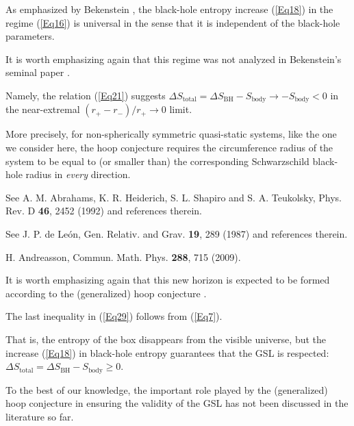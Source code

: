 \documentclass[12pt,preprintnumbers,amsmath,amssymbm,prd]{revtex4-1}
\begin{document}
\begin{thebibliography}{99}
 As emphasized by Bekenstein \cite{Bek73}, the black-hole entropy
increase (\ref{Eq18}) in the regime (\ref{Eq16}) \cite{Noteimb} is
universal in the sense that it is independent of the black-hole
parameters.

 It is worth emphasizing again \cite{Noteim,Noteimb}
that this regime was not analyzed in Bekenstein's seminal paper
\cite{Bek73}.

 Namely, the relation (\ref{Eq21}) suggests $\Delta
S_{\text{total}}=\Delta S_{\text{BH}}-S_{\text{body}}\to
-S_{\text{body}}<0$ in the near-extremal $(r_+-r_-)/r_+\to 0$ limit.

 More precisely, for non-spherically symmetric quasi-static systems,
like the one we consider here, the hoop conjecture \cite{Thorne}
requires the circumference radius of the system to be equal to (or
smaller than) the corresponding Schwarzschild black-hole radius in
{\it every} direction.

  See A. M. Abrahams, K. R. Heiderich, S. L. Shapiro and S. A. Teukolsky,
Phys. Rev. D {\bf 46}, 2452 (1992) and references therein.

 See J. P. de Le\'on, Gen. Relativ. and Grav. {\bf 19},
289 (1987) and references therein.

 H. Andreasson, Commun. Math. Phys. {\bf 288}, 715 (2009).

 It is worth emphasizing again that
this new horizon is expected to be formed according to the
(generalized) hoop conjecture \cite{Thorne}.

 The last inequality in (\ref{Eq29}) follows from
(\ref{Eq7}).

 That is, the entropy of the box disappears from the visible universe,
but the increase (\ref{Eq18}) in black-hole entropy guarantees that
the GSL is respected: $\Delta S_{\text{total}}=\Delta
S_{\text{BH}}-S_{\text{body}}\geq0$.

 To the best of our knowledge, the important role
played by the (generalized) hoop conjecture in ensuring the validity
of the GSL has not been discussed in the literature so far.

\end{thebibliography}
\end{document}
